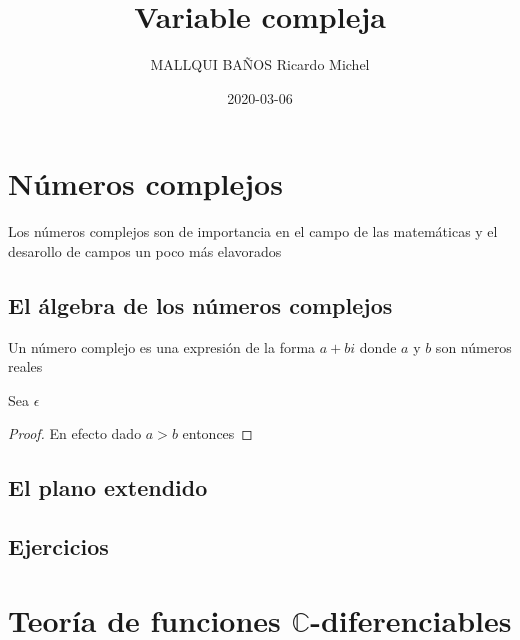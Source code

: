 \documentclass[]{book}
\title{Variable compleja}
\author{MALLQUI BAÑOS Ricardo Michel}
\date{2020-03-06}
\theoremstyle{definition}
\theoremstyle{definition}
\theoremstyle{definition}
\theoremstyle{remark}
\let\BeginKnitrBlock\begin \let\EndKnitrBlock\end
\begin{document}
\maketitle

{
\setcounter{tocdepth}{1}
\tableofcontents
}
\hypertarget{nuxfameros-complejos}{%
\chapter{Números complejos}\label{nuxfameros-complejos}}

Los números complejos son de importancia en el campo de las matemáticas y el desarollo de campos un poco más elavorados

\hypertarget{el-uxe1lgebra-de-los-nuxfameros-complejos}{%
\section{El álgebra de los números complejos}\label{el-uxe1lgebra-de-los-nuxfameros-complejos}}

\BeginKnitrBlock{definition}[Número complejo]
\protect\hypertarget{def:unnamed-chunk-1}{}{\label{def:unnamed-chunk-1} \iffalse (Número complejo) \fi{} }Un número complejo es una expresión de la forma \(a+bi\) donde \(a\) y \(b\) son números reales
\EndKnitrBlock{definition}

\BeginKnitrBlock{theorem}
\protect\hypertarget{thm:unnamed-chunk-2}{}{\label{thm:unnamed-chunk-2} }Sea \(\epsilon\)
\EndKnitrBlock{theorem}

\BeginKnitrBlock{proof}
\iffalse{} {Demostración. } \fi{}En efecto dado \(a>b\) entonces
\EndKnitrBlock{proof}

\hypertarget{el-plano-extendido}{%
\section{El plano extendido}\label{el-plano-extendido}}

\hypertarget{ejercicios}{%
\section{Ejercicios}\label{ejercicios}}

\BeginKnitrBlock{exercise}
\protect\hypertarget{exr:unnamed-chunk-4}{}{\label{exr:unnamed-chunk-4} }
\EndKnitrBlock{exercise}

\BeginKnitrBlock{solution}
\iffalse{} {Solución. } \fi{}
\EndKnitrBlock{solution}

\hypertarget{teoruxeda-de-funciones-mathbbc-diferenciables}{%
\chapter{\texorpdfstring{Teoría de funciones \(\mathbb{C}\)-diferenciables}{Teoría de funciones \textbackslash{}mathbb\{C\}-diferenciables}}\label{teoruxeda-de-funciones-mathbbc-diferenciables}}
\end{document}
